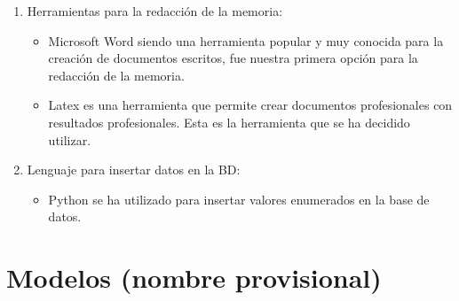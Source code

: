 \documentclass[11pt]{article}
\begin{document}
\begin{enumerate}
	\item Herramientas para la redacción de la memoria:
	\begin{itemize} 
		\item Microsoft Word siendo una herramienta popular y muy conocida para la creación de documentos escritos, fue nuestra primera opción para la redacción de la memoria.
		\item Latex es una herramienta que permite crear documentos profesionales con resultados profesionales. Esta es la herramienta que se ha decidido utilizar.
	\end{itemize}
	\item Lenguaje para insertar datos en la BD:
	\begin{itemize} 
		\item Python se ha utilizado para insertar valores enumerados en la base de datos.
	\end{itemize}
\end{enumerate}


\section{Modelos (nombre provisional)}
\end{document}
